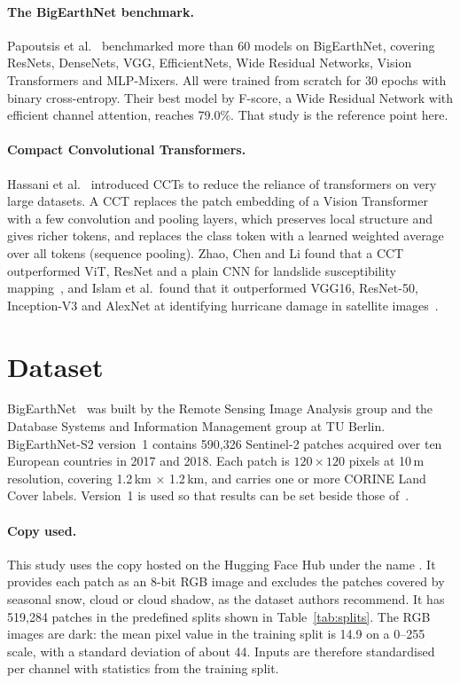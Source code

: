 \documentclass[11pt]{article}
\begin{document}
\paragraph{The BigEarthNet benchmark.}
Papoutsis et al.~\cite{papoutsis} benchmarked more than 60 models on BigEarthNet, covering ResNets,
DenseNets, VGG, EfficientNets, Wide Residual Networks, Vision Transformers and MLP-Mixers. All were
trained from scratch for 30 epochs with binary cross-entropy. Their best model by F-score, a Wide Residual
Network with efficient channel attention, reaches 79.0\%. That study is the reference point here.

\paragraph{Compact Convolutional Transformers.}
Hassani et al.~\cite{hassani} introduced CCTs to reduce the reliance of transformers on very large
datasets. A CCT replaces the patch embedding of a Vision Transformer with a few convolution and pooling
layers, which preserves local structure and gives richer tokens, and replaces the class token with a
learned weighted average over all tokens (sequence pooling). Zhao, Chen and Li found that a CCT
outperformed ViT, ResNet and a plain CNN for landslide susceptibility mapping~\cite{zhao}, and Islam et
al.\ found that it outperformed VGG16, ResNet-50, Inception-V3 and AlexNet at identifying hurricane damage
in satellite images~\cite{islam}.

\section{Dataset}

BigEarthNet~\cite{sumbul} was built by the Remote Sensing Image Analysis group and the Database Systems
and Information Management group at TU Berlin. BigEarthNet-S2 version~1 contains 590,326 Sentinel-2
patches acquired over ten European countries in 2017 and 2018. Each patch is $120\times120$ pixels at
10\,m resolution, covering 1.2\,km $\times$ 1.2\,km, and carries one or more CORINE Land Cover labels.
Version~1 is used so that results can be set beside those of~\cite{papoutsis}.

\paragraph{Copy used.}
This study uses the copy hosted on the Hugging Face Hub under the name
. It provides each patch as an 8-bit RGB image and excludes the
patches covered by seasonal snow, cloud or cloud shadow, as the dataset authors recommend. It has
519,284 patches in the predefined splits shown in Table~\ref{tab:splits}. The RGB images are dark: the
mean pixel value in the training split is 14.9 on a 0--255 scale, with a standard deviation of about 44.
Inputs are therefore standardised per channel with statistics from the training split.
\end{document}

